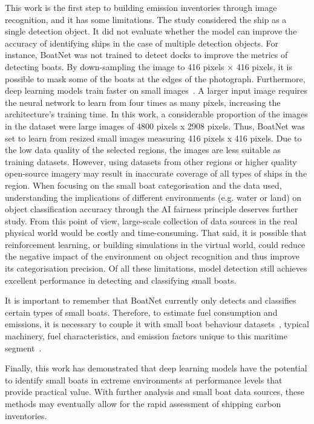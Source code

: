 This work is the first step to building emission inventories through image recognition, and it has some limitations. The study considered the ship as a single detection object. It did not evaluate whether the model can improve the accuracy of identifying ships in the case of multiple detection objects. For instance, BoatNet was not trained to detect docks to improve the metrics of detecting boats. By down-sampling the image to 416 pixels × 416 pixels, it is possible to mask some of the boats at the edges of the photograph.
Furthermore, deep learning models train faster on small images~\cite{tan2021efficientnetv2}. A larger input image requires the neural network to learn from four times as many pixels, increasing the architecture's training time. In this work, a considerable proportion of the images in the dataset were large images of 4800 pixels x 2908 pixels. Thus, BoatNet was set to learn from resized small images measuring 416 pixels x 416 pixels. Due to the low data quality of the selected regions, the images are less suitable as training datasets. However, using datasets from other regions or higher quality open-source imagery may result in inaccurate coverage of all types of ships in the region. When focusing on the small boat categorisation and the data used, understanding the implications of different environments (e.g. water or land) on object classification accuracy through the AI fairness principle deserves further study. From this point of view, large-scale collection of data sources in the real physical world would be costly and time-consuming. That said, it is possible that reinforcement learning, or building simulations in the virtual world, could reduce the negative impact of the environment on object recognition and thus improve its categorisation precision. Of all these limitations, model detection still achieves excellent performance in detecting and classifying small boats.

It is important to remember that BoatNet currently only detects and classifies certain types of small boats. Therefore, to estimate fuel consumption and emissions, it is necessary to couple it with small boat behaviour datasets~\cite{ferrer2021mexican}, typical machinery, fuel characteristics, and emission factors unique to this maritime segment~\cite{inecc2020inventario}. 

Finally, this work has demonstrated that deep learning models have the potential to identify small boats in extreme environments at performance levels that provide practical value. With further analysis and small boat data sources, these methods may eventually allow for the rapid assessment of shipping carbon inventories.